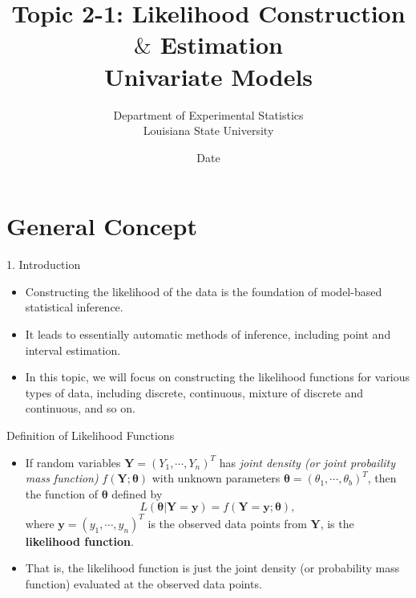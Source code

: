 \documentclass{beamer}
\title[]{Topic 2-1: Likelihood Construction $\&$ Estimation \\
Univariate Models}
\author{Department of Experimental Statistics \\
Louisiana State University}
\institute{}
\date{Date}
\begin{document}
\begin{frame}
  \titlepage
\end{frame}


\section{General Concept}

\begin{frame}{1. Introduction}
        \begin{itemize}
            \item Constructing the likelihood of the data is the foundation of model-based statistical inference.
            \item It leads to essentially automatic methods of inference, including point and interval estimation. 
            \item In this topic, we will focus on constructing the likelihood functions for various types of data, including discrete, continuous, mixture of discrete and continuous, and so on.
        \end{itemize}
    \end{frame}
    \begin{frame}{Definition of Likelihood Functions}
        \begin{itemize}
            \item If random variables $\boldsymbol{Y} = (Y_{1}, \cdots, Y_{n})^{T}$ has {\it joint density (or joint probaility mass function)} $f(\boldsymbol{Y}; \boldsymbol{\theta})$ with unknown parameters $\boldsymbol{\theta} = (\theta_{1}, \cdots, \theta_{b})^{T}$, then the function of  $\boldsymbol{\theta}$ defined by 
$$
L(\boldsymbol{\theta}|\boldsymbol{Y}  = \boldsymbol{y}) = f(\boldsymbol{Y} = \boldsymbol{y};\boldsymbol{\theta}),
$$
where $\boldsymbol{y} = (y_{1}, \cdots, y_{n})^{T}$ is the observed data points from $\boldsymbol{Y}$, is the {\bf likelihood function}.
           \item  That is, the likelihood function is just the joint density (or probability mass function) evaluated at the observed data points.

        \end{itemize}
    \end{frame}
\end{document}
